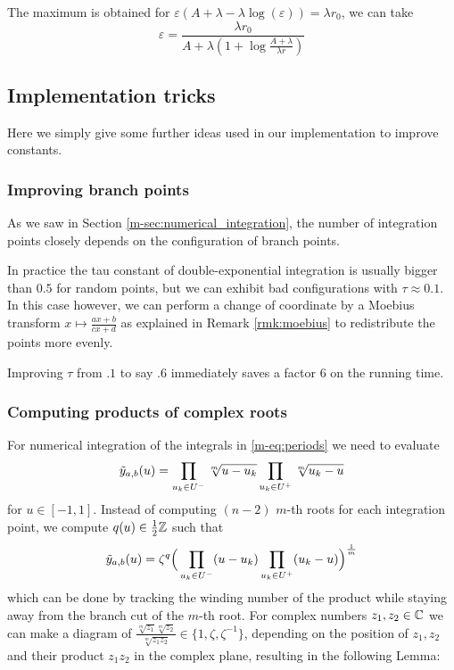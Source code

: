 \documentclass[main.tex]{subfiles}
\begin{document}
   The maximum is obtained for $ε(A+λ-λ\log(ε))=λr_0$,
   we can take
   \[ ε = \frac{λr_0}{A+λ(1+\log\frac{A+λ}{λr})} \]
   
   \subsection{Implementation tricks}

   Here we simply give some further ideas used in our implementation to improve constants.

   \subsubsection{Improving branch points}

   As we saw in Section \ref{m-sec:numerical_integration}, the number of integration points
   closely depends on the configuration of branch points.

   In practice the tau constant of double-exponential integration is usually bigger than $0.5$
   for random points, but we can exhibit bad configurations with $τ\approx 0.1$.
   In this case however, we can perform a change of coordinate by a Moebius transform
   $x\mapsto \frac{ax+b}{cx+d}$ as explained in Remark \ref{rmk:moebius} to redistribute the points more evenly.

   Improving $τ$ from $.1$ to say $.6$ immediately saves a factor $6$ on the running time.

  \subsubsection{Computing products of complex roots}\label{subsec:computing_roots}

  For numerical integration of the integrals in \eqref{m-eq:periods}
  we need to evaluate
  \begin{equation*}
   \tilde{y}_{a,b}(u) = \prod_{u_k\in U^-} \sqrt[m]{u-u_k}\prod_{u_k\in U^+}\sqrt[m]{u_k-u}
  \end{equation*}
  for $u \in [-1,1]$. Instead of computing $(n-2)$ $m$-th roots for each
  integration point, we compute $q(u)\in\frac12\mathbb{Z}$ such that
  \begin{equation*}
   \tilde{y}_{a,b}(u) = \zeta^q \Big( \prod_{u_k\in U^-}(u-u_k) \prod_{u_k\in U^+} (u_k-u) \Big)^{\frac{1}{m}}
  \end{equation*}
 which can be done by tracking
  the winding number of the product while staying away from the branch cut
  of the $m$-th root.
  For complex numbers $z_1,z_2 \in \mathbb{C}$ we can make a diagram of
  $\frac{\sqrt[m]{z_1}\sqrt[m]{z_2}}{\sqrt[m]{z_1z_2}} \in \{ 1, \zeta,
  \zeta^{-1} \}$, depending on the position of $z_1,z_2$ and their product
  $z_1z_2$ in the complex plane, resulting in the following Lemma:
\end{document}
